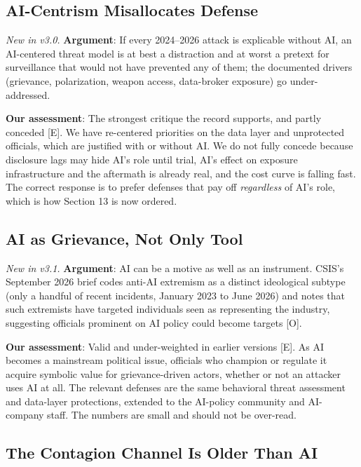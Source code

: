 \documentclass[11pt,letterpaper]{article}
\begin{document}
\subsection{AI-Centrism Misallocates Defense}

\textit{New in v3.0.} \textbf{Argument}: If every 2024--2026 attack is explicable without AI, an AI-centered threat model is at best a distraction and at worst a pretext for surveillance that would not have prevented any of them; the documented drivers (grievance, polarization, weapon access, data-broker exposure) go under-addressed.

\textbf{Our assessment}: The strongest critique the record supports, and partly conceded [E]. We have re-centered priorities on the data layer and unprotected officials, which are justified with or without AI. We do not fully concede because disclosure lags may hide AI's role until trial, AI's effect on exposure infrastructure and the aftermath is already real, and the cost curve is falling fast. The correct response is to prefer defenses that pay off \textit{regardless} of AI's role, which is how Section 13 is now ordered.

\subsection{AI as Grievance, Not Only Tool}

\textit{New in v3.1.} \textbf{Argument}: AI can be a motive as well as an instrument. CSIS's September 2026 brief codes anti-AI extremism as a distinct ideological subtype (only a handful of recent incidents, January 2023 to June 2026) and notes that such extremists have targeted individuals seen as representing the industry, suggesting officials prominent on AI policy could become targets [O].

\textbf{Our assessment}: Valid and under-weighted in earlier versions [E]. As AI becomes a mainstream political issue, officials who champion or regulate it acquire symbolic value for grievance-driven actors, whether or not an attacker uses AI at all. The relevant defenses are the same behavioral threat assessment and data-layer protections, extended to the AI-policy community and AI-company staff. The numbers are small and should not be over-read.

\subsection{The Contagion Channel Is Older Than AI}
\end{document}
